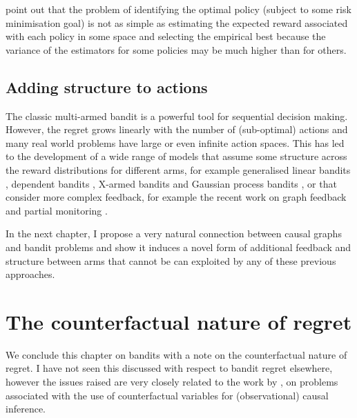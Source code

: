 \documentclass[11pt,a4paper,oneside]{book}
\theoremstyle{plain}
\theoremstyle{definition}
\begin{document}
\citet{Swaminathan2015} point out that the problem of identifying the optimal policy (subject to some risk minimisation goal) is not as simple as estimating the expected reward associated with each policy in some space and selecting the empirical best because the variance of the estimators for some policies may be much higher than for others.

\subsection{Adding structure to actions}

The classic multi-armed bandit is a powerful tool for sequential decision making. However, the regret grows linearly with the number of (sub-optimal) actions and many real world problems have large or even infinite action spaces. This has led to the development of a wide range of models that assume some structure across the reward distributions for different arms, for example generalised linear bandits \citep{filippi2010parametric}, dependent bandits \citep{Pandey2007}, X-armed bandits \citep{Bubeck2010} and Gaussian process bandits \citep{srinivas2009gaussian}, or that consider more complex feedback, for example the recent work on graph feedback\citep{Mannor2011,Lelarge2012,Alon2013,Buccapatnam2014,Kocak2014,Alon2015} and partial monitoring \citep{Piccolboni2001,Bartok2014}.

In the next chapter, I propose a very natural connection between causal graphs and bandit problems and show it induces a novel form of additional feedback and structure between arms that cannot be can exploited by any of these previous approaches. 

\section{The counterfactual nature of regret}
\label{sec:counterfactual-nature-regret}

We conclude this chapter on bandits with a note on the counterfactual nature of regret. I have not seen this discussed with respect to bandit regret elsewhere, however the issues raised are very closely related to the work by \citet{Dawid2000}, on problems associated with the use of counterfactual variables for (observational) causal inference.
\end{document}
